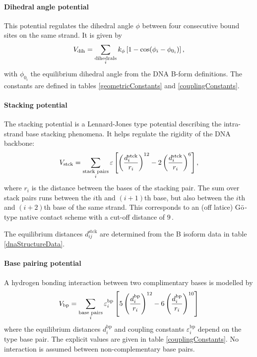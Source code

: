 \paragraph{Dihedral angle potential}
This potential regulates the dihedral angle $\phi$ between four consecutive bound sites on the same strand. It is given by
\begin{equation}
V_\text{dih}
= \sum_{\substack{\text{dihedrals}\\i}}
	k_\phi \left[ 1 - \cos (\phi_i - \phi_{0_i}) \right],
\end{equation}
with $\phi_{0_i}$ the equilibrium dihedral angle from the DNA B-form definitions. The constants are defined in tables \ref{geometricConstants} and \ref{couplingConstants}.


\paragraph{Stacking potential}
The stacking potential is a Lennard-Jones type potential describing the intra-strand base stacking phenomena. It helps regulate the rigidity of the DNA backbone:
\begin{equation}
V_\text{stck}
= \sum_{\substack{\text{stack pairs}\\i}}
	\varepsilon \left[
       		   \left(\frac{d^\text{stck}_i}{r_i} \right)^{12}
       		- 2\left(\frac{d^\text{stck}_i}{r_i} \right)^{6}
       	\right],
\end{equation}
where $r_i$ is the distance between the bases of the stacking pair. The sum over stack pairs runs between the $i$th and $(i+1)$th base, but also between the $i$th and $(i+2)$th base of the same strand.
This corresponds to an (off latice) G$\bar{\text o}$-type native contact scheme\cite{hoangcieplak, cieplak2003folding} with a cut-off distance of $9$\,\Angstrom.

The equilibrium distances $d_{ij}^\text{stck}$ are determined from the B isoform data in table \ref{dnaStructureData}.


\paragraph{Base pairing potential}
A hydrogen bonding interaction between two complimentary bases is modelled by
\begin{equation}
V_\text{bp}
= \sum_{\substack{\text{base pairs}\\i}}
\varepsilon^\text{bp}_i \left[
	  5\left(\frac{d^\text{bp}_i}{r_i} \right)^{12}
	- 6\left(\frac{d^\text{bp}_i}{r_i} \right)^{10}
\right]
\end{equation}
where the equilibrium distances $d^\text{bp}_i$ and coupling constants $\varepsilon^\text{bp}_i$ depend on the type base pair. The explicit values are given in table \ref{couplingConstants}. No interaction is assumed between non-complementary base pairs.


